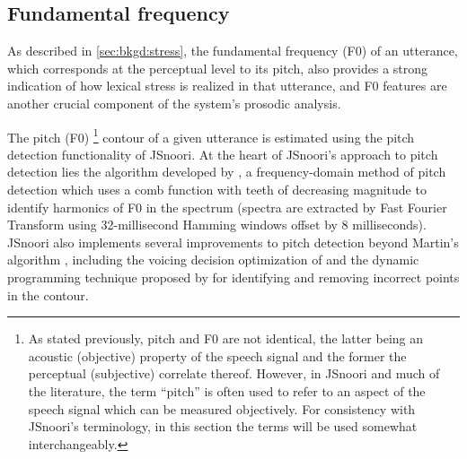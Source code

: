 	\subsection{Fundamental frequency}
	\label{sec:prosody:f0}
	
	
	As described in \cref{sec:bkgd:stress}, the fundamental frequency (F0) of an utterance, which corresponds at the perceptual level to its pitch, also provides a strong indication of how lexical stress is realized in that utterance, and F0 features 
	are another crucial component of
	the system's prosodic analysis. 
	
	
	The pitch (F0)%
	\footnote{ As stated previously, pitch and F0 are not identical, 
	the latter being an acoustic (objective) property of the speech signal and the former the perceptual (subjective) correlate thereof. 
	However, in JSnoori and much of the literature, the term ``pitch'' is often used to refer to an aspect of the speech signal which can be measured objectively.
	For consistency with JSnoori's terminology, in this section the terms will be used somewhat interchangeably.}
	 contour of a given utterance is estimated using the pitch detection 
	functionality of 
	JSnoori. At the heart of JSnoori's approach to pitch detection lies the algorithm developed by \textcite{Martin1982}, a frequency-domain method of pitch detection which uses a comb function with teeth of decreasing magnitude to identify harmonics of F0 in the spectrum (spectra are extracted by Fast Fourier Transform using 32-millisecond Hamming windows offset by 8 milliseconds). JSnoori also implements several improvements to pitch detection beyond Martin's algorithm \citep{DiMartino1999}, including
	 the voicing decision optimization of   \textcite{Secrest1983} 
	 and the dynamic programming technique proposed by \textcite{Ney1981} for identifying and removing incorrect points in the contour. 
	
